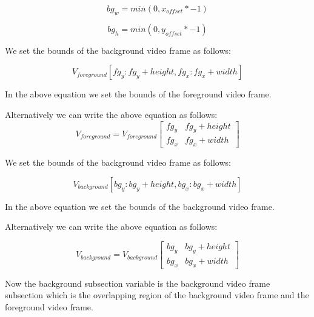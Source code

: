 \documentclass[ebook,12pt,oneside,openany]{memoir}
\begin{document}
\begin{equation}
    bg_{w} = min(0, x_{offset} * -1)
\end{equation}

\begin{equation}
    bg_{h} = min(0, y_{offset} * -1)
\end{equation}

We set the bounds of the background video frame as follows:

\begin{equation}
    V_{foreground}[fg_{y}:fg_{y} + height, fg_{x}:fg_{x} + width]    
\end{equation}

In the above equation we set the bounds of the foreground video frame.

Alternatively we can write the above equation as follows:
\begin{equation}
    V_{foreground} = V_{foreground} \begin{bmatrix} 
        fg_{y} & fg_{y} + height \\
        fg_{x} & fg_{x} + width
    \end{bmatrix}    
\end{equation}

We set the bounds of the background video frame as follows:

\begin{equation}
    V_{background}[bg_{y}:bg_{y} + height, bg_{x}:bg_{x} + width]
\end{equation}

In the above equation we set the bounds of the background video frame.

Alternatively we can write the above equation as follows:

\begin{equation}
    V_{background} = V_{background} \begin{bmatrix} 
        bg_{y} & bg_{y} + height \\
        bg_{x} & bg_{x} + width
    \end{bmatrix}
\end{equation}

Now the background subsection variable is the background video frame subsection which is the overlapping region of the background video frame and the foreground video frame.
\end{document}
